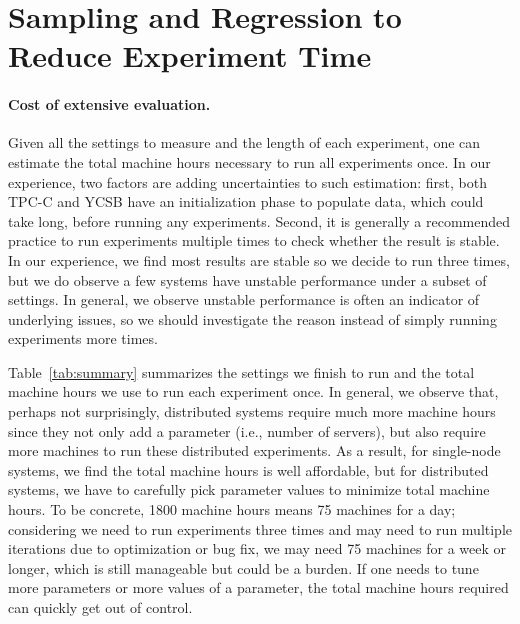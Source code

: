 \section{Sampling and Regression to Reduce Experiment Time}
\label{sec:regression}

\vspace{-.1in}
\paragraph{Cost of extensive evaluation.}
Given all the settings to measure and the length of each experiment,
one can estimate the total machine hours necessary to run all experiments
once. In our experience, two factors are adding uncertainties to such
estimation: first, both TPC-C and YCSB have an initialization phase to
populate data, which could take long, before running any experiments. 
Second, it is generally a recommended practice to
run experiments multiple times to check whether the result is stable. In
our experience, we find most results are stable so we decide to run three
times, but we do observe a few systems have unstable performance under
a subset of settings. In general, we observe unstable performance
is often an indicator of underlying issues, so we should investigate the
reason instead of simply running experiments more times.

Table~\ref{tab:summary} summarizes the settings we finish to run
and the total machine hours we use to run each experiment once. In general, we observe that,
perhaps not surprisingly, distributed systems require much more
machine hours since they not only add a parameter
(i.e., number of servers), but also require more machines to run these distributed experiments.
As a result, for single-node systems, we find the total machine hours is well affordable,
but for distributed systems, we have to carefully pick parameter values to minimize
total machine hours. To be concrete, 1800 machine hours means 75 machines
for a day; considering we need to run experiments three times and
may need to run multiple iterations due to optimization or bug fix, we may need 75
machines for a week or longer, which is still manageable but could be a burden.
If one needs to tune more parameters or more values of
a parameter, the total machine hours required can quickly get out of control. 

\newcommand{\specialcell}[2][c]{%
  \begin{tabular}[#1]{@{}c@{}}#2\end{tabular}}
 
